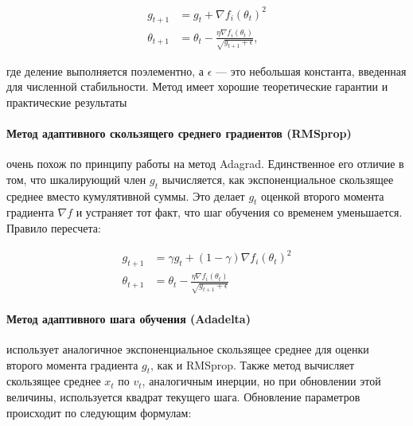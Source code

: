 \documentclass[12pt]{article}
\begin{document}
\begin{equation}
\begin{aligned}
g_{t+1} &= g_t + \nabla f_i(\theta_t) ^2\\
\theta_{t+1} &= \theta_t - \frac{\eta \nabla f_i(\theta_t)}{\sqrt{g_{t+1} + \epsilon}},
\end{aligned}
\end{equation}

где деление выполняется поэлементно, а $\epsilon$ --- это небольшая константа, введенная для численной стабильности. Метод имеет хорошие теоретические гарантии и практические результаты~\cite{adagrad}

\paragraph{Метод адаптивного скользящего среднего градиентов (RMSprop)} \cite{rmsprop} очень похож по принципу работы на метод Adagrad. Единственное его отличие в том, что шкалирующий член $g_t$ вычисляется, как экспоненциальное скользящее среднее вместо кумулятивной суммы. Это делает $g_t$ оценкой второго момента градиента $\nabla f$ и устраняет тот факт, что шаг обучения со временем уменьшается. Правило пересчета:

\begin{equation}
\begin{aligned}
g_{t+1} &= \gamma g_t + (1 - \gamma) \nabla f_i(\theta_t)^2\\
\theta_{t+1} &= \theta_t - \frac{\eta \nabla f_i(\theta_t)}{\sqrt{g_{t+1} + \epsilon}}
\end{aligned}
\end{equation}



\paragraph{Метод адаптивного шага обучения (Adadelta)} \cite{adadelta} использует аналогичное экспоненциальное скользящее среднее для оценки второго момента градиента $g_t$, как и RMSprop. Также метод вычисляет скользящее среднее $x_t$ по $v_t$, аналогичным инерции, но при обновлении этой величины, используется квадрат текущего шага. Обновление параметров происходит по следующим формулам:
\end{document}
